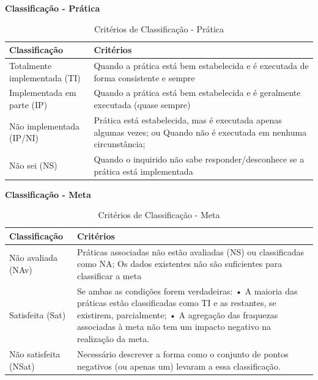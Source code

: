 \documentclass[openany,10pt,a4paper]{article}
\begin{document}
\begin{appendix}
\begin{table}[h]
	\textbf{Classificação - Prática}
		\centering
		\caption{Critérios de Classificação - Prática}
		\begin{tabular}{p{1in}p{5in}}		
			\toprule
			\textbf{Classificação}  & \textbf{Critérios}\\ 
			\midrule
			Totalmente implementada	(TI) & Quando a prática está bem estabelecida e é executada de forma
			consistente e sempre \\
			\midrule
			Implementada em parte (IP) & Quando a prática está bem estabelecida e é geralmente executada
			(quase sempre) \\
			\midrule
			Não implementada (IP/NI) & Prática está estabelecida, mas é executada apenas algumas vezes; ou
			Quando não é executada em nenhuma circunstância; \\
			\midrule
			Não sei (NS) & Quando o inquirido não sabe responder/desconhece se a prática está
			implementada \\
			\bottomrule
		\end{tabular} 
\end{table}

\begin{table}[h]
	\textbf{Classificação - Meta}
		\centering
		\caption{Critérios de Classificação - Meta}
		\begin{tabular}{p{1in}p{5in}}		
			\toprule
			\textbf{Classificação}  & \textbf{Critérios}\\ 
			\midrule
			Não avaliada (NAv) & Práticas associadas não estão avaliadas (NS) ou classificadas como NA;
			Os dados existentes não são suficientes para classificar a meta \\
			\midrule
			Satisfeita (Sat) & Se ambas as condições forem verdadeiras:
			• A maioria das práticas estão classificadas como TI e as restantes,
			se existirem, parcialmente;
			• A agregação das fraquezas associadas à meta não tem um impacto
			negativo na realização da meta.	 \\
			\midrule
			Não satisfeita (NSat) & Necessário descrever a forma como o conjunto de pontos negativos
			(ou apenas um) levaram a essa classificação. \\
			\bottomrule
		\end{tabular} 
\end{table}


\end{appendix}
\end{document}
